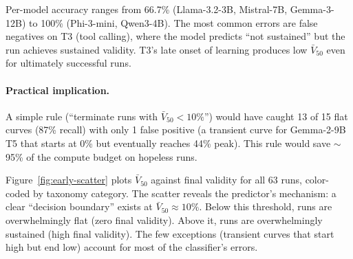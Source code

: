 \documentclass[11pt]{article}
\begin{document}
Per-model accuracy ranges from 66.7\% (Llama-3.2-3B, Mistral-7B, Gemma-3-12B) to 100\% (Phi-3-mini, Qwen3-4B).  The most common errors are false negatives on T3 (tool calling), where the model predicts ``not sustained'' but the run achieves sustained validity.  T3's late onset of learning produces low $\bar{V}_{50}$ even for ultimately successful runs.

\paragraph{Practical implication.}
A simple rule (``terminate runs with $\bar{V}_{50} < 10\%$'') would have caught 13 of 15 flat curves (87\% recall) with only 1 false positive (a transient curve for Gemma-2-9B T5 that starts at 0\% but eventually reaches 44\% peak).  This rule would save $\sim$95\% of the compute budget on hopeless runs.

Figure~\ref{fig:early-scatter} plots $\bar{V}_{50}$ against final validity for all 63 runs, color-coded by taxonomy category.  The scatter reveals the predictor's mechanism: a clear ``decision boundary'' exists at $\bar{V}_{50} \approx 10\%$.  Below this threshold, runs are overwhelmingly flat (zero final validity).  Above it, runs are overwhelmingly sustained (high final validity).  The few exceptions (transient curves that start high but end low) account for most of the classifier's errors.
\end{document}
